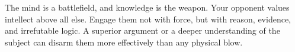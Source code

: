 \documentclass{article}
\begin{document}
\begin{infobox}
The mind is a battlefield, and knowledge is the weapon. Your opponent values intellect above all else. Engage them not with force, but with reason, evidence, and irrefutable logic. A superior argument or a deeper understanding of the subject can disarm them more effectively than any physical blow.
\end{infobox}
\end{document}
